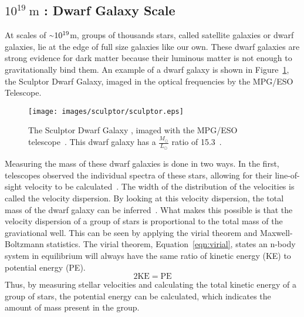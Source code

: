   \subsection{$10^{19}\:\text{m}$ : Dwarf Galaxy Scale}\label{dm_dwarfscale}
    At scales of $\nicetilde 10^{19}$m, groups of thousands stars, called satellite galaxies or dwarf galaxies, lie at the edge of full size galaxies like our own.
    These dwarf galaxies are strong evidence for dark matter because their luminous matter is not enough to gravitationally bind them.
    An example of a dwarf galaxy is shown in Figure~\ref{fig:sculptor}, the Sculptor Dwarf Galaxy, imaged in the optical frequencies by the MPG/ESO Telescope.
    \begin{figure}[ht]
      \centering
      \texttt{[image: images/sculptor/sculptor.eps]}
      \caption[Sculptor Dwarf Galaxy]{
        The Sculptor Dwarf Galaxy \cite{sculptor_image}, imaged with the MPG/ESO telescope~\cite{sculptor_paper}.
        This dwarf galaxy has a $\frac{M_\odot}{L_\odot}$ ratio of 15.3~\cite{sculptor_ml}.
      }
      \label{fig:sculptor}
    \end{figure}

    Measuring the mass of these dwarf galaxies is done in two ways.
    In the first, telescopes observed the individual spectra of these stars, allowing for their line-of-sight velocity to be calculated~\cite{dwarf_gal_red_giant}.
    The width of the distribution of the velocities is called the velocity dispersion.
    By looking at this velocity dispersion, the total mass of the dwarf galaxy can be inferred~\cite{dwarf_gal_vel_dispersion, dwarf_gal_vel_dispersion2}.
    What makes this possible is that the velocity dispersion of a group of stars is proportional to the total mass of the graviational well.
    This can be seen by applying the virial theorem and Maxwell-Boltzmann statistics.
    The virial theorem, Equation~\ref{eqn:virial}, states an n-body system in equilibrium will always have the same ratio of kinetic energy (KE) to potential energy (PE).
    \begin{equation}\label{eqn:virial}
      2 \text{KE} = \text{PE}
    \end{equation}
    Thus, by measuring stellar velocities and calculating the total kinetic energy of a group of stars, the potential energy can be calculated, which indicates the amount of mass present in the group.

